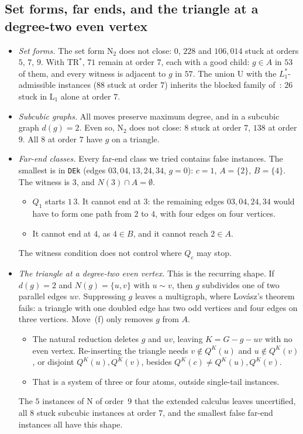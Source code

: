 \documentclass[11pt]{amsart}
\theoremstyle{definition}
\begin{document}
\subsection{Set forms, far ends, and the triangle at a degree-two even vertex}
\begin{itemize}
\item \emph{Set forms.} The set form N$_2$ does not close: $0$, $228$ and $106{,}014$ stuck at
orders $5$, $7$, $9$. With TR$^*$, $71$ remain at order $7$, each with a good child: $g\in A$ in
$53$ of them, and every witness is adjacent to $g$ in $57$. The union U with the
$L_1^*$-admissible instances ($88$ stuck at order $7$) inherits the blocked
family of~\cite{L1I}: $26$ stuck in L$_1$ alone at order $7$.
\item \emph{Subcubic graphs.} All moves preserve maximum degree, and in a subcubic graph $d(g)=2$.
Even so, N$_2$ does not close: $8$ stuck at order $7$, $138$ at order $9$. All $8$ at order $7$
have $g$ on a triangle.
\item \emph{Far-end classes.} Every far-end class we tried contains false instances. The smallest
is in \texttt{DEk} (edges $03,04,13,24,34$, $g=0$): $c=1$, $A=\{2\}$, $B=\{4\}$. The witness is
$3$, and $N(3)\cap A=\emptyset$.
  \begin{itemize}
  \item $Q_1$ starts $1\,3$. It cannot end at $3$: the remaining edges $03,04,24,34$ would have to
  form one path from $2$ to $4$, with four edges on four vertices.
  \item It cannot end at $4$, as $4\in B$, and it cannot reach $2\in A$.
  \end{itemize}
  The witness condition does not control where $Q_c$ may stop.
\item \emph{The triangle at a degree-two even vertex.} This is the recurring shape. If $d(g)=2$ and
$N(g)=\{u,v\}$ with $u\sim v$, then $g$ subdivides one of two parallel edges $uv$. Suppressing $g$
leaves a multigraph, where Lov\'asz's theorem fails: a triangle with one doubled edge has two odd
vertices and four edges on three vertices. Move~(f) only removes $g$ from $A$.
  \begin{itemize}
  \item The natural reduction deletes $g$ and $uv$, leaving $K=G-g-uv$ with no even vertex.
  Re-inserting the triangle needs $v\notin Q^K(u)$ and $u\notin Q^K(v)$, or disjoint
  $Q^K(u),Q^K(v)$, besides $Q^K(c)\ne Q^K(u),Q^K(v)$.
  \item That is a system of three or four atoms, outside single-tail instances.
  \end{itemize}
  The $5$ instances of N of order~$9$ that the extended calculus leaves uncertified, all $8$ stuck
  subcubic instances at order $7$, and the smallest false far-end instances all have this shape.
\end{itemize}
\end{document}
